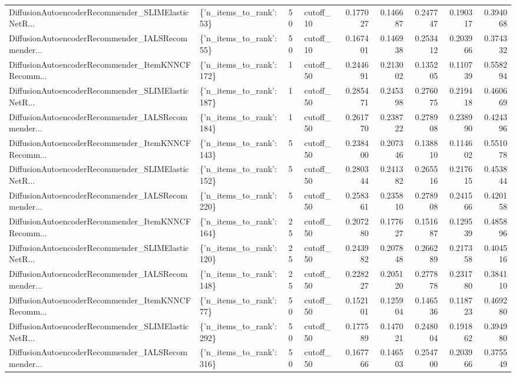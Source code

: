 \begin{tabular}{llllrrrrr}
DiffusionAutoencoderRecommender\_SLIMElasticNetR... &  \{'n\_items\_to\_rank': 53\} &       50 & cutoff\_10 & 0.177027 &   0.146687 &       0.247747 &           0.190317 &            0.394068 \\
DiffusionAutoencoderRecommender\_IALSRecommender... &  \{'n\_items\_to\_rank': 55\} &       50 & cutoff\_10 & 0.167401 &   0.146938 &       0.253412 &           0.203966 &            0.374332 \\
DiffusionAutoencoderRecommender\_ItemKNNCFRecomm... & \{'n\_items\_to\_rank': 172\} &        1 & cutoff\_50 & 0.244691 &   0.213002 &       0.135205 &           0.110739 &            0.558294 \\
DiffusionAutoencoderRecommender\_SLIMElasticNetR... & \{'n\_items\_to\_rank': 187\} &        1 & cutoff\_50 & 0.285471 &   0.245398 &       0.276075 &           0.219418 &            0.460669 \\
DiffusionAutoencoderRecommender\_IALSRecommender... & \{'n\_items\_to\_rank': 184\} &        1 & cutoff\_50 & 0.261770 &   0.238722 &       0.278908 &           0.238990 &            0.424396 \\
DiffusionAutoencoderRecommender\_ItemKNNCFRecomm... & \{'n\_items\_to\_rank': 143\} &        5 & cutoff\_50 & 0.238400 &   0.207346 &       0.138810 &           0.114602 &            0.551078 \\
DiffusionAutoencoderRecommender\_SLIMElasticNetR... & \{'n\_items\_to\_rank': 152\} &        5 & cutoff\_50 & 0.280344 &   0.241382 &       0.265516 &           0.217615 &            0.453844 \\
DiffusionAutoencoderRecommender\_IALSRecommender... & \{'n\_items\_to\_rank': 220\} &        5 & cutoff\_50 & 0.258361 &   0.235810 &       0.278908 &           0.241566 &            0.420158 \\
DiffusionAutoencoderRecommender\_ItemKNNCFRecomm... & \{'n\_items\_to\_rank': 164\} &       25 & cutoff\_50 & 0.207280 &   0.177627 &       0.151687 &           0.129539 &            0.485896 \\
DiffusionAutoencoderRecommender\_SLIMElasticNetR... & \{'n\_items\_to\_rank': 120\} &       25 & cutoff\_50 & 0.243982 &   0.207848 &       0.266289 &           0.217358 &            0.404516 \\
DiffusionAutoencoderRecommender\_IALSRecommender... & \{'n\_items\_to\_rank': 148\} &       25 & cutoff\_50 & 0.228227 &   0.205120 &       0.277878 &           0.231780 &            0.384110 \\
DiffusionAutoencoderRecommender\_ItemKNNCFRecomm... &  \{'n\_items\_to\_rank': 77\} &       50 & cutoff\_50 & 0.152101 &   0.125904 &       0.146536 &           0.118723 &            0.469280 \\
DiffusionAutoencoderRecommender\_SLIMElasticNetR... & \{'n\_items\_to\_rank': 292\} &       50 & cutoff\_50 & 0.177589 &   0.147021 &       0.248004 &           0.191862 &            0.394980 \\
DiffusionAutoencoderRecommender\_IALSRecommender... & \{'n\_items\_to\_rank': 316\} &       50 & cutoff\_50 & 0.167766 &   0.146503 &       0.254700 &           0.203966 &            0.375549 \\
\bottomrule
\end{tabular}
